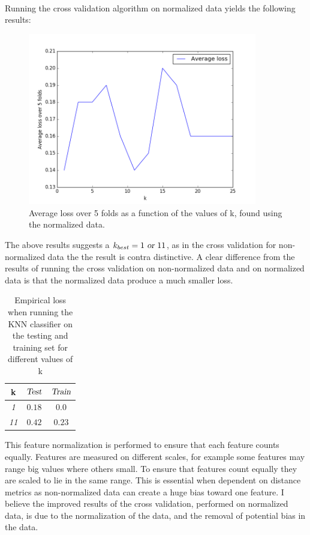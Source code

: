 \documentclass{article}
\begin{document}
\\
Running the cross validation algorithm on normalized data yields the following results:
\begin{figure}[H]
  \centering
  \includegraphics[width=10cm]{ass12.png}
  \caption{Average loss over 5 folds as a function of the values of k, found using the normalized data.}
  \label{fig:fig1}
\end{figure}
The above results suggests a $k_{best} = 1 \textsl{ or } 11$, as in the cross validation for non-normalized data the the result is contra distinctive. A clear difference from the results of running the cross validation on non-normalized data and on normalized data is that the normalized data produce a much smaller loss.
\begin{table}[H]
  \centering
  \label{tab:table4}
  \begin{tabular}{c||c|c}
    \textsf{k} & $\textsl{Test}$ & $\textsl{Train}$\\
    \hline
    \textsl{1} & $0.18$ & $0.0$ \\
    \textsl{11} & $ 0.42 $ & $ 0.23 $ \\    
  \end{tabular}
  \caption{Empirical loss when running the KNN classifier on the testing and training set for different values of k} 
\end{table}
This feature normalization is performed to ensure that each feature counts equally. Features are measured on different scales, for example some features may range big values where others small. To ensure that features count equally they are scaled to lie in the same range. This is essential when dependent on distance metrics as non-normalized data can create a huge bias toward one feature. I believe the improved results of the cross validation, performed on normalized data, is due to the normalization of the data, and the removal of potential bias in the data.
\end{document}
